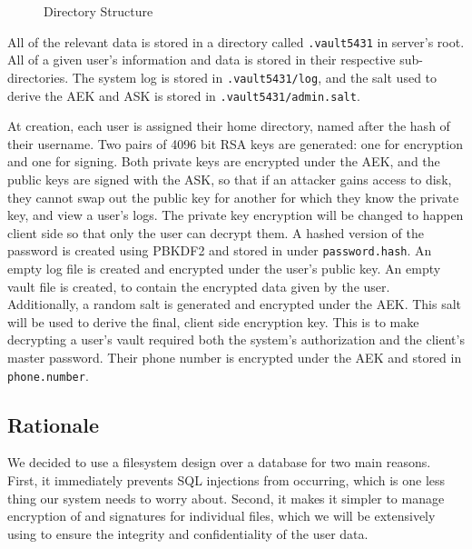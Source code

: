 \documentclass{article}
\begin{document}
\begin{figure}[H]
  \centering
  \begin{subfigure}[b]{0.3\textwidth}
  \end{subfigure}
  \caption{Directory Structure}
  \label{fig:directory_structure}
\end{figure}

\par All of the relevant data is stored in a directory called \texttt{.vault5431} in server's root. All of a given user's information and data is stored in their respective sub-directories. The system log is stored in \texttt{.vault5431/log}, and the salt used to derive the AEK and ASK is stored in \texttt{.vault5431/admin.salt}.
\par At creation, each user is assigned their home directory, named after the hash of their username. Two pairs of 4096 bit RSA keys are generated: one for encryption and one for signing. Both private keys are encrypted under the AEK, and the public keys are signed with the ASK, so that if an attacker gains access to disk, they cannot swap out the public key for another for which they know the private key, and view a user's logs. The private key encryption will be changed to happen client side so that only the user can decrypt them. A hashed version of the password is created using PBKDF2 and stored in under \texttt{password.hash}. An empty log file is created and encrypted under the user's public key. An empty vault file is created, to contain the encrypted data given by the user. Additionally, a random salt is generated and encrypted under the AEK. This salt will be used to derive the final, client side encryption key. This is to make decrypting a user's vault required both the system's authorization and the client's master password. Their phone number is encrypted under the AEK and stored in \texttt{phone.number}.

\subsection{Rationale}
\par We decided to use a filesystem design over a database for two main reasons. First, it immediately prevents SQL injections from occurring, which is one less thing our system needs to worry about. Second, it makes it simpler to manage encryption of and signatures for individual files, which we will be extensively using to ensure the integrity and confidentiality of the user data.
\end{document}
